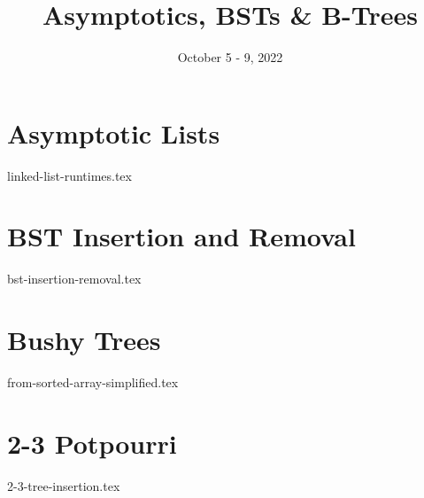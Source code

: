 \documentclass[11pt]{exam}
\title{Asymptotics, BSTs \& B-Trees}
\date{October 5 - 9, 2022}
\begin{document}
\maketitle


\section{Asymptotic Lists}
\begin{questions}
{linked-list-runtimes.tex}
\end{questions}


\pagebreak
\section{BST Insertion and Removal}
\begin{questions}
{bst-insertion-removal.tex}
\end{questions}


\pagebreak
\section{Bushy Trees}
\begin{questions}
{from-sorted-array-simplified.tex}
\end{questions}


\pagebreak
\section{2-3 Potpourri}
\begin{questions}
{2-3-tree-insertion.tex}
\end{questions}
\end{document}
